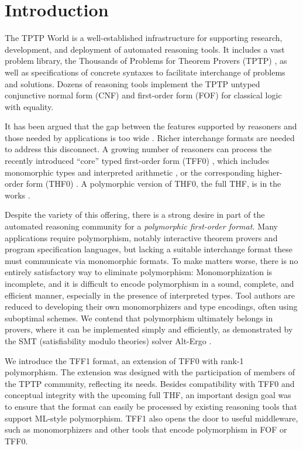 \section{Introduction}
\label{sec_intro}

The TPTP World \cite{sutcliffe-2010-world} is a well-established infrastructure
for supporting research, development, and deployment of automated reasoning
tools. It includes a vast problem library, the Thousands of Problems for Theorem
Provers (TPTP) \cite{sutcliffe-2009-lib}, as well as specifications of concrete
syntaxes to facilitate interchange of problems and solutions.
Dozens of reasoning tools implement the TPTP untyped conjunctive normal form
(CNF) and first-order form (FOF) for classical logic with equality.

It has been argued that the gap between the features supported by
reasoners and those needed by applications is too wide
\cite{kuncak-2011,stickel-2009,voronkov-2003}. Richer interchange formats are
needed to address this disconnect.
A growing number of reasoners can process the
recently introduced ``core'' typed first-order form (TFF0) \cite{sutcliffe-et-al-2012-tff0},
which includes monomorphic types and interpreted arithmetic \cite{SPASS-T,vampire-arith},
or the corresponding higher-order form (THF0) \cite{benzmueller-et-al-2008-thf0}.
A polymorphic version of THF0, the full THF, is in the works
\cite{sutcliffe-benzmueller-2010}.

Despite the variety of this offering, there is a strong desire in part of the automated
reasoning community for a \emph{polymorphic first-order format.} Many applications
require polymorphism, notably interactive theorem provers and program
specification languages, but lacking a suitable interchange format these
must communicate via monomorphic formats. To make matters worse, there is no entirely
satisfactory way to eliminate polymorphism: Monomorphization is %
incomplete, and it is difficult to encode polymorphism in a sound, complete, and
efficient manner, especially in the presence of interpreted types. Tool authors
are reduced to developing their own monomorphizers and type encodings, often
using suboptimal schemes. We contend that polymorphism ultimately belongs in
provers, where it can be implemented simply and efficiently, as demonstrated by
the SMT (satisfiability modulo theories) solver Alt-Ergo \cite{bobot-et-al-2008}.

We introduce the TFF1
format, an extension of TFF0 with rank-1 polymorphism. The
extension was designed with the participation of members of the TPTP community,
reflecting its needs.
Besides compatibility with TFF0 and conceptual integrity with the upcoming full
THF, an important design goal was to ensure that the format can easily be
processed by existing reasoning tools that support ML-style polymorphism. TFF1
also opens the door to useful middleware, such as monomorphizers and other
tools that encode polymorphism in FOF or TFF0.

